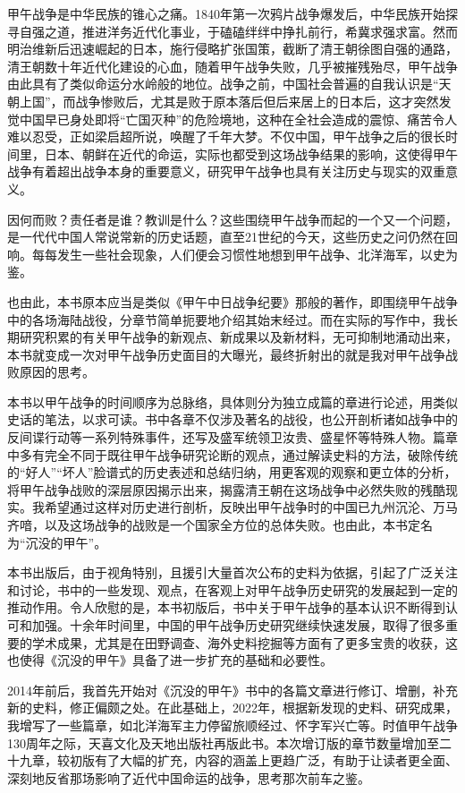 \documentclass[12pt,UTF8]{ctexbook}
\begin{document}
甲午战争是中华民族的锥心之痛。1840年第一次鸦片战争爆发后，中华民族开始探寻自强之道，推进洋务近代化事业，于磕磕绊绊中挣扎前行，希冀求强求富。然而明治维新后迅速崛起的日本，施行侵略扩张国策，截断了清王朝徐图自强的通路，清王朝数十年近代化建设的心血，随着甲午战争失败，几乎被摧残殆尽，甲午战争由此具有了类似命运分水岭般的地位。战争之前，中国社会普遍的自我认识是“天朝上国”，而战争惨败后，尤其是败于原本落后但后来居上的日本后，这才突然发觉中国早已身处即将“亡国灭种”的危险境地，这种在全社会造成的震惊、痛苦令人难以忍受，正如梁启超所说，唤醒了千年大梦。不仅中国，甲午战争之后的很长时间里，日本、朝鲜在近代的命运，实际也都受到这场战争结果的影响，这使得甲午战争有着超出战争本身的重要意义，研究甲午战争也具有关注历史与现实的双重意义。

因何而败？责任者是谁？教训是什么？这些围绕甲午战争而起的一个又一个问题，是一代代中国人常说常新的历史话题，直至21世纪的今天，这些历史之问仍然在回响。每每发生一些社会现象，人们便会习惯性地想到甲午战争、北洋海军，以史为鉴。

也由此，本书原本应当是类似《甲午中日战争纪要》那般的著作，即围绕甲午战争中的各场海陆战役，分章节简单扼要地介绍其始末经过。而在实际的写作中，我长期研究积累的有关甲午战争的新观点、新成果以及新材料，无可抑制地涌动出来，本书就变成一次对甲午战争历史面目的大曝光，最终折射出的就是我对甲午战争战败原因的思考。

本书以甲午战争的时间顺序为总脉络，具体则分为独立成篇的章进行论述，用类似史话的笔法，以求可读。书中各章不仅涉及著名的战役，也公开剖析诸如战争中的反间谍行动等一系列特殊事件，还写及盛军统领卫汝贵、盛星怀等特殊人物。篇章中多有完全不同于既往甲午战争研究论断的观点，通过解读史料的方法，破除传统的“好人”“坏人”脸谱式的历史表述和总结归纳，用更客观的观察和更立体的分析，将甲午战争战败的深层原因揭示出来，揭露清王朝在这场战争中必然失败的残酷现实。我希望通过这样对历史进行剖析，反映出甲午战争时的中国已九州沉沦、万马齐喑，以及这场战争的战败是一个国家全方位的总体失败。也由此，本书定名为“沉没的甲午”。

本书出版后，由于视角特别，且援引大量首次公布的史料为依据，引起了广泛关注和讨论，书中的一些发现、观点，在客观上对甲午战争历史研究的发展起到一定的推动作用。令人欣慰的是，本书初版后，书中关于甲午战争的基本认识不断得到认可和加强。十余年时间里，中国的甲午战争历史研究继续快速发展，取得了很多重要的学术成果，尤其是在田野调查、海外史料挖掘等方面有了更多宝贵的收获，这也使得《沉没的甲午》具备了进一步扩充的基础和必要性。

2014年前后，我首先开始对《沉没的甲午》书中的各篇文章进行修订、增删，补充新的史料，修正偏颇之处。在此基础上，2022年，根据新发现的史料、研究成果，我增写了一些篇章，如北洋海军主力停留旅顺经过、怀字军兴亡等。时值甲午战争130周年之际，天喜文化及天地出版社再版此书。本次增订版的章节数量增加至二十九章，较初版有了大幅的扩充，内容的涵盖上更趋广泛，有助于让读者更全面、深刻地反省那场影响了近代中国命运的战争，思考那次前车之鉴。
\end{document}
